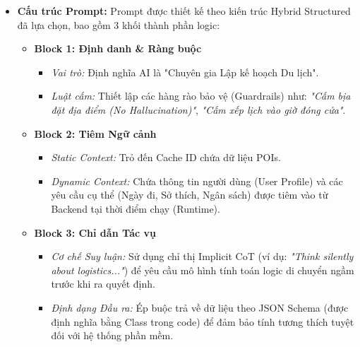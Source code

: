 \begin{itemize}
    \item \textbf{Cấu trúc Prompt:} Prompt được thiết kế theo kiến trúc Hybrid Structured đã lựa chọn, bao gồm 3 khối thành phần logic:
    \begin{itemize}
        \item \textbf{Block 1: Định danh \& Ràng buộc}
        \begin{itemize}
            \item \textit{Vai trò:} Định nghĩa AI là "Chuyên gia Lập kế hoạch Du lịch".
            \item \textit{Luật cấm:} Thiết lập các hàng rào bảo vệ (Guardrails) như: \textit{"Cấm bịa đặt địa điểm (No Hallucination)"}, \textit{"Cấm xếp lịch vào giờ đóng cửa"}.
        \end{itemize}
        
        \item \textbf{Block 2: Tiêm Ngữ cảnh}
        \begin{itemize}
            \item \textit{Static Context:} Trỏ đến Cache ID chứa dữ liệu POIs.
            \item \textit{Dynamic Context:} Chứa thông tin người dùng (User Profile) và các yêu cầu cụ thể (Ngày đi, Sở thích, Ngân sách) được tiêm vào từ Backend tại thời điểm chạy (Runtime).
        \end{itemize}
        
        \item \textbf{Block 3: Chỉ dẫn Tác vụ}
        \begin{itemize}
            \item \textit{Cơ chế Suy luận:} Sử dụng chỉ thị Implicit CoT (ví dụ: \textit{"Think silently about logistics..."}) để yêu cầu mô hình tính toán logic di chuyển ngầm trước khi ra quyết định.
            \item \textit{Định dạng Đầu ra:} Ép buộc trả về dữ liệu theo JSON Schema (được định nghĩa bằng Class trong code) để đảm bảo tính tương thích tuyệt đối với hệ thống phần mềm.
        \end{itemize}
    \end{itemize}
\end{itemize}


